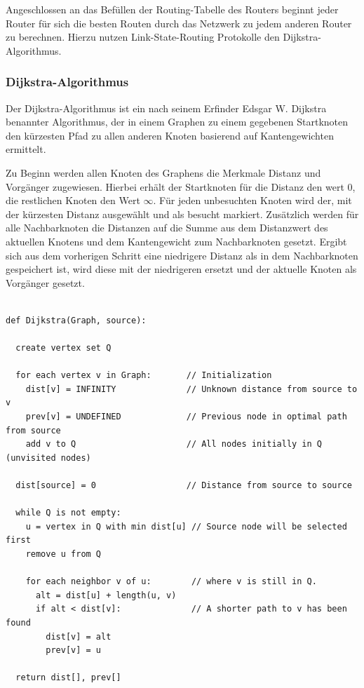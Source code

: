 \documentclass[11pt,a4paper,final]{article}
\begin{document}
Angeschlossen an das Befüllen der Routing-Tabelle des Routers beginnt jeder Router für sich die besten Routen durch das Netzwerk zu jedem anderen Router zu berechnen.
Hierzu nutzen Link-State-Routing Protokolle den Dijkstra-Algorithmus.
\subsubsection{Dijkstra-Algorithmus}
Der Dijkstra-Algorithmus ist ein nach seinem Erfinder Edsgar W. Dijkstra benannter Algorithmus, der in einem Graphen zu einem gegebenen Startknoten den kürzesten Pfad zu allen anderen Knoten basierend auf Kantengewichten ermittelt.

Zu Beginn werden allen Knoten des Graphens die Merkmale Distanz und Vorgänger zugewiesen. Hierbei erhält der Startknoten für die Distanz den wert $0$, die restlichen Knoten den Wert $\infty$.
Für jeden unbesuchten Knoten wird der, mit der kürzesten Distanz ausgewählt und als besucht markiert.
Zusätzlich werden für alle Nachbarknoten die Distanzen auf die Summe aus dem Distanzwert des aktuellen Knotens und dem Kantengewicht zum Nachbarknoten gesetzt.
Ergibt sich aus dem vorherigen Schritt eine niedrigere Distanz als in dem Nachbarknoten gespeichert ist, wird diese mit der niedrigeren ersetzt und der aktuelle Knoten als Vorgänger gesetzt.\\\\
\begin{verbatim}
def Dijkstra(Graph, source):

  create vertex set Q

  for each vertex v in Graph:       // Initialization
    dist[v] = INFINITY              // Unknown distance from source to v
    prev[v] = UNDEFINED             // Previous node in optimal path from source
    add v to Q                      // All nodes initially in Q (unvisited nodes)

  dist[source] = 0                  // Distance from source to source

  while Q is not empty:
    u = vertex in Q with min dist[u] // Source node will be selected first
    remove u from Q

    for each neighbor v of u:        // where v is still in Q.
      alt = dist[u] + length(u, v)
      if alt < dist[v]:              // A shorter path to v has been found
        dist[v] = alt
        prev[v] = u

  return dist[], prev[]
\end{verbatim}
\newpage
\end{document}
